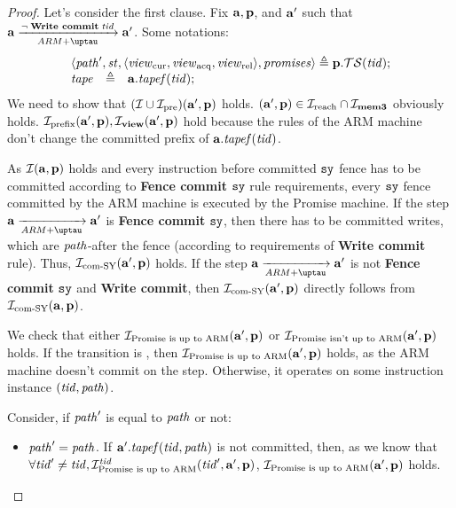 \begin{proof}
  Let's consider the first clause.
  Fix $\mathbf{a}, \mathbf{p}$, and $\mathbf{a}'$ such that $\aT \armStepgen{\lnot \; \transenv{Write commit} \; \tId} \aT'$.
  Some notations:
\[
\begin{array}{l l l}
\multicolumn{3}{l}{\angled{\cpath', \PromState, \angled{\Rcur, \Racq, \Rrel}, \PromSet} \triangleq \p.\TSfprom(\tId);}\\
\tape     & \triangleq & \aT.\tapef(\tId); \\
\end{array}
\]
  We need to show that $(\mathcal{I} \cup \mathcal{I}_{\textup{\rm pre}})(\mathbf{a}', \mathbf{p})$ holds.
  $(\mathbf{a}', \mathbf{p}) \in \mathcal{I}_{\textup{\rm reach}} \cap \mathcal{I}_{\rm \bf mem3}$ obviously holds.
  $\mathcal{I}_{\textup{\rm prefix}}(\mathbf{a}', \mathbf{p}), \mathcal{I}_{\rm \bf view}(\mathbf{a}', \mathbf{p})$ hold because
  the rules of the ARM machine don't change the committed prefix of $\mathbf{a}.\mathit{tapef}(\mathit{tid})$.

  As $\mathcal{I}(\mathbf{a}, \mathbf{p})$ holds and every instruction before committed $\mathtt{sy}$ fence has to be committed according to
  {\sf \bf Fence commit} $\mathtt{sy}$ rule requirements, every $\mathtt{sy}$ fence committed by the ARM machine is executed by the Promise
  machine. If the step $\aT \armStepgen{} \aT'$ is {\sf \bf Fence commit} $\mathtt{sy}$, then there has to be committed writes,
  which are $\mathit{path}$-after the fence (according to requirements of {\sf \bf Write commit} rule). Thus,
  $\mathcal{I}_{\textup{\rm com-SY}}(\mathbf{a}', \mathbf{p})$ holds. If the step $\aT \armStepgen{} \aT'$ is not {\sf \bf Fence commit} $\mathtt{sy}$ and {\sf \bf Write commit},
  then $\mathcal{I}_{\textup{\rm com-SY}}(\mathbf{a}', \mathbf{p})$ directly follows from $\mathcal{I}_{\textup{\rm com-SY}}(\mathbf{a}, \mathbf{p})$.

We check that either $\mathcal{I}_{\textup{\rm Promise is up to ARM}}(\mathbf{a}', \mathbf{p})$ or $\mathcal{I}_{\textup{\rm Promise isn't up to ARM}}(\mathbf{a}', \mathbf{p})$ holds.
If the transition is , then $\mathcal{I}_{\textup{\rm Promise is up to ARM}}(\mathbf{a}', \mathbf{p})$ holds, as the ARM machine
doesn't commit on the step. Otherwise, it operates on some instruction instance $(\mathit{tid}, \mathit{path})$.

Consider, if $\mathit{path}'$ is equal to $\mathit{path}$ or not:
\begin{itemize}
  \item $\mathit{path}' = \mathit{path}$. 
    If $\mathbf{a}'.\mathit{tapef}(\mathit{tid}, \mathit{path})$ is not committed, then,
    as we know that $\forall \mathit{tid}' \not = \mathit{tid}, \mathcal{I}^{\mathit{tid}}_{\textup{Promise is up to ARM}}(\mathit{tid}', \mathbf{a}', \mathbf{p})$,
    $\mathcal{I}_{\textup{\rm Promise is up to ARM}}(\mathbf{a}', \mathbf{p})$ holds.


\end{itemize}
\end{proof}
